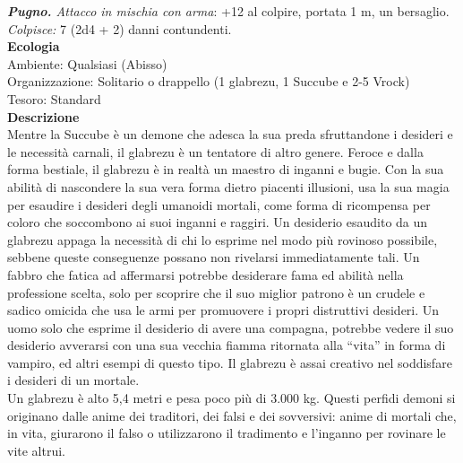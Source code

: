 \begin{multicols}{2}
\emph{\textbf{Pugno.} Attacco in mischia con arma}: +12 al colpire, portata 1 m, un bersaglio.\\
\emph{Colpisce:} 7 (2d4 + 2) danni contundenti.\\
\textbf{Ecologia}\\
Ambiente: Qualsiasi (Abisso)\\
Organizzazione: Solitario o drappello (1 glabrezu, 1 Succube e 2-5 Vrock)\\
Tesoro: Standard\\
\textbf{Descrizione}\\
Mentre la Succube è un demone che adesca la sua preda sfruttandone i desideri e le necessità carnali, il glabrezu è un tentatore di altro genere. Feroce e dalla forma bestiale, il glabrezu è in realtà un maestro di inganni e bugie. Con la sua abilità di nascondere la sua vera forma dietro piacenti illusioni, usa la sua magia per esaudire i desideri degli umanoidi mortali, come forma di ricompensa per coloro che soccombono ai suoi inganni e raggiri. Un desiderio esaudito da un glabrezu appaga la necessità di chi lo esprime nel modo più rovinoso possibile, sebbene queste conseguenze possano non rivelarsi immediatamente tali. Un fabbro che fatica ad affermarsi potrebbe desiderare fama ed abilità nella professione scelta, solo per scoprire che il suo miglior patrono è un crudele e sadico omicida che usa le armi per promuovere i propri distruttivi desideri. Un uomo solo che esprime il desiderio di avere una compagna, potrebbe vedere il suo desiderio avverarsi con una sua vecchia fiamma ritornata alla “vita” in forma di vampiro, ed altri esempi di questo tipo. Il glabrezu è assai creativo nel soddisfare i desideri di un mortale.\\
Un glabrezu è alto 5,4 metri e pesa poco più di 3.000 kg. Questi perfidi demoni si originano dalle anime dei traditori, dei falsi e dei sovversivi: anime di mortali che, in vita, giurarono il falso o utilizzarono il tradimento e l’inganno per rovinare le vite altrui.\\


\end{multicols}
